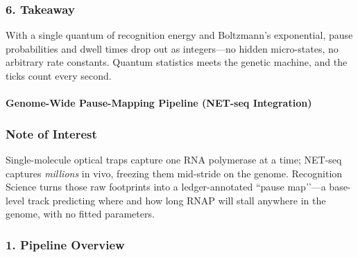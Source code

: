 \documentclass[11pt,oneside]{book}
\begin{document}
\subsubsection*{6. Takeaway}

With a single quantum of recognition energy and Boltzmann’s exponential,
pause probabilities and dwell times drop out as integers—no hidden
micro-states, no arbitrary rate constants.
Quantum statistics meets the genetic machine, and the ticks count every
second.

\bigskip
\paragraph{Genome-Wide Pause-Mapping Pipeline (NET-seq Integration)}
\label{sec:dnarp-toolchain}

\subsubsection*{Note of Interest}

Single-molecule optical traps capture one RNA polymerase at a time;  
NET-seq captures \emph{millions} in vivo, freezing them mid-stride on the
genome.  
Recognition Science turns those raw footprints into a ledger-annotated
“pause map’’—a base-level track predicting where and how long RNAP will
stall anywhere in the genome, with no fitted parameters.

\subsubsection*{1. Pipeline Overview}

\begin{center}
\end{center}
\end{document}
